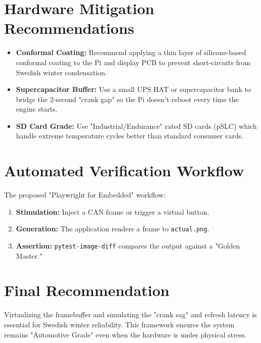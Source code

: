 \documentclass[11pt, a4paper]{article}
\begin{document}
\section{Hardware Mitigation Recommendations}
\begin{itemize}
    \item \textbf{Conformal Coating:} Recommend applying a thin layer of silicone-based conformal coating to the Pi and display PCB to prevent short-circuits from Swedish winter condensation.
    \item \textbf{Supercapacitor Buffer:} Use a small UPS HAT or supercapacitor bank to bridge the 2-second "crank gap" so the Pi doesn't reboot every time the engine starts.
    \item \textbf{SD Card Grade:} Use "Industrial/Endurance" rated SD cards (pSLC) which handle extreme temperature cycles better than standard consumer cards.
\end{itemize}

\section{Automated Verification Workflow}
The proposed "Playwright for Embedded" workflow:
\begin{enumerate}
    \item \textbf{Stimulation:} Inject a CAN frame or trigger a virtual button.
    \item \textbf{Generation:} The application renders a frame to \texttt{actual.png}.
    \item \textbf{Assertion:} \texttt{pytest-image-diff} compares the output against a "Golden Master."
\end{enumerate}

\section{Final Recommendation}
Virtualizing the framebuffer and simulating the "crank sag" and refresh latency is essential for Swedish winter reliability. This framework ensures the system remains "Automotive Grade" even when the hardware is under physical stress.
\end{document}
